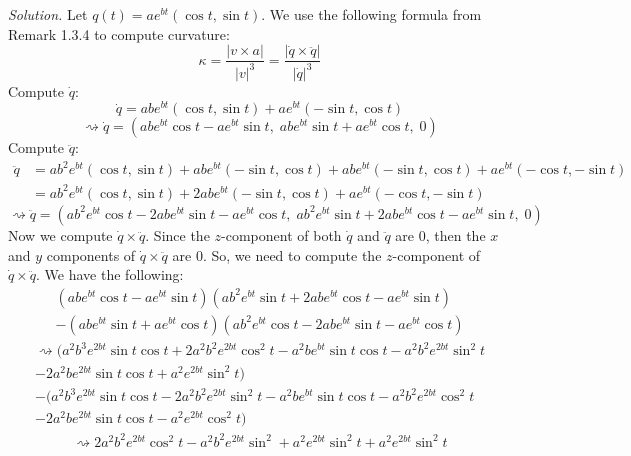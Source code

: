 \documentclass[12pt]{article}
\newcommand\abs[1]{\left| #1 \right|}
\newcommand\parens[1]{\left( #1 \right)}
\newcommand\sol[1]{\begin{mdframed}
\emph{Solution.} #1
\end{mdframed}}
\begin{document}
\sol{
    Let $q(t) = ae^{bt}\parens{\cos t, \sin t}$. We use the following formula from Remark 1.3.4 to compute curvature:
    \begin{equation*}\label{eq:1:3:12}\tag{eq. 1.3.12}
        \kappa = \frac{\abs{v \times a}}{\abs{v}^3} = \frac{\abs{\dot{q} \times \ddot{q}}}{\abs{\dot{q}}^3}
    \end{equation*}
    Compute $\dot{q}$:
    \[\dot{q} = abe^{bt}\parens{\cos t, \sin t} + ae^{bt}\parens{-\sin t, \cos t}\]
    \[\rightsquigarrow \dot{q} = \parens{abe^{bt}\cos t - ae^{bt}\sin t,\; abe^{bt}\sin t + ae^{bt}\cos t,\; 0}\]
    Compute $\ddot{q}$:
    \begin{align*}
        \ddot{q} &= ab^2e^{bt}\parens{\cos t, \sin t} + abe^{bt}\parens{-\sin t, \cos t} + abe^{bt}\parens{-\sin t, \cos t} + ae^{bt}\parens{-\cos t, -\sin t} \\
        &= ab^2e^{bt}\parens{\cos t, \sin t} + 2abe^{bt}\parens{-\sin t, \cos t} + ae^{bt}\parens{-\cos t, -\sin t}
    \end{align*}
    \[\rightsquigarrow \ddot{q} = \parens{ab^2e^{bt}\cos t - 2abe^{bt}\sin t - ae^{bt}\cos t,\; ab^2e^{bt}\sin t + 2abe^{bt}\cos t - ae^{bt}\sin t,\; 0}\]
    Now we compute $\dot{q} \times \ddot{q}$. Since the $z$-component of both $\dot{q}$ and $\ddot{q}$ are $0$, then the $x$ and $y$ components of $\dot{q} \times \ddot{q}$ are $0$. So, we need to compute the $z$-component of $\dot{q} \times \ddot{q}$. We have the following:
    \begin{multline*}
        \parens{abe^{bt}\cos t - ae^{bt}\sin t}\parens{ab^2e^{bt}\sin t + 2abe^{bt}\cos t - ae^{bt}\sin t} \\
        - \parens{abe^{bt}\sin t + ae^{bt}\cos t}\parens{ab^2e^{bt}\cos t - 2abe^{bt}\sin t - ae^{bt}\cos t}
    \end{multline*}
    \begin{multline*}
        \rightsquigarrow (a^2b^3e^{2bt}\sin t\cos t + 2a^2b^2e^{2bt}\cos^2 t - a^2be^{bt}\sin t \cos t - a^2b^2e^{2bt}\sin^2 t \\
        - 2a^2be^{2bt}\sin t \cos t + a^2e^{2bt}\sin^2 t) \\
        - (a^2b^3e^{2bt}\sin t\cos t - 2a^2b^2e^{2bt}\sin^2 t - a^2be^{bt}\sin t \cos t - a^2b^2e^{2bt}\cos^2 t \\
        - 2a^2be^{2bt}\sin t \cos t - a^2e^{2bt}\cos^2 t)
    \end{multline*}
    \begin{multline*}
        \rightsquigarrow 2a^2b^2e^{2bt}\cos^2t - a^2b^2e^{2bt}\sin^2 + a^2e^{2bt}\sin^2t + a^2e^{2bt}\sin^2 t \\

\end{multline*}}
\end{document}
